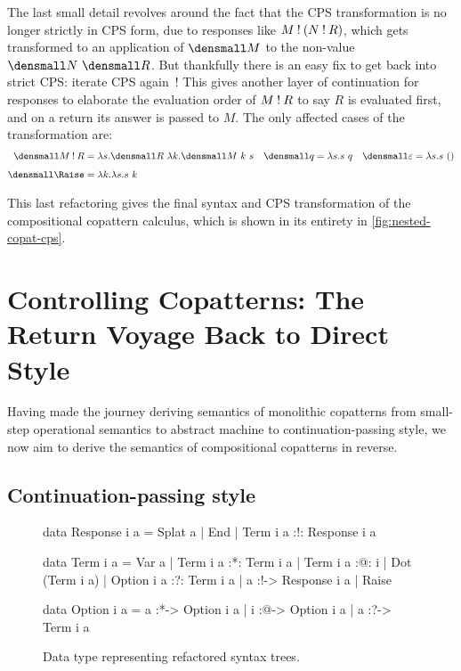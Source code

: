 \documentclass[sigplan,screen]{acmart}
\begin{document}
The last small detail revolves around the fact that the CPS transformation is no
longer strictly in CPS form, due to responses like $M \mathbin{!} (N \mathbin{!} R)$, which
gets transformed to an application of $\den{M}$ to the non-value
$\den{N}~\den{R}$.  But thankfully there is an easy fix to get back into strict
CPS: iterate CPS again~\cite{AbstractingControl}!  This gives another layer of
continuation for responses to elaborate the evaluation order of $M \mathbin{!} R$ to
say $R$ is evaluated first, and on a return its answer is passed to $M$.  The
only affected cases of the transformation are:
\begin{align*}
  \den{M \ans R}
  &=
  \lambda s. \den{R} ~ \lambda k. \den{M} ~ k ~ s
  &
  \den{q}
  &=
  \lambda s. s ~ q
  &
  \den{\varepsilon}
  &=
  \lambda s. s ~ ()
  \\[1ex]
  \den{\Raise}
  &=
  \lambda k. \lambda s. s ~ k
\end{align*}

This last refactoring gives the final syntax and CPS transformation of the
compositional copattern calculus, which is shown in its entirety in
\cref{fig:nested-copat-cps}.

\section{Controlling Copatterns: The Return Voyage Back to Direct Style}
\label{sec:control-copat}

Having made the journey deriving semantics of monolithic copatterns from
small-step operational semantics to abstract machine to continuation-passing
style, we now aim to derive the semantics of compositional copatterns in reverse.


\subsection{Continuation-passing style}

\begin{figure}
\centering
\begin{haskell}
data Response i a
  = Splat a
  | End
  | Term i a :!: Response i a

data Term i a
  = Var a
  | Term i a :*: Term i a
  | Term i a :@: i
  | Dot (Term i a)
  | Option i a :?: Term i a
  | a :!-> Response i a
  | Raise

data Option i a
  = a :*-> Option i a
  | i :@-> Option i a
  | a :?-> Term i a
\end{haskell}
\caption{Data type representing refactored syntax trees.}
\label{fig:nest-syntax-code}
\end{figure}
\end{document}
